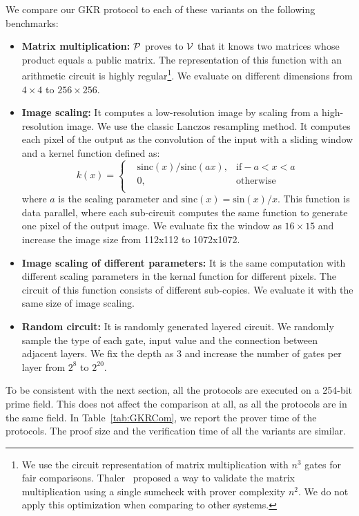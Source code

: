 We compare our GKR protocol to each of these variants on the following benchmarks:
\begin{itemize}
	\item
	\textbf{Matrix multiplication:} $\P$ proves to $\V$ that it knows two matrices whose product equals a public matrix. The representation of this function with an arithmetic circuit is highly regular\footnote{We use the circuit representation of matrix multiplication with $n^3$ gates for fair comparisons. Thaler~\cite{t13} proposed a way to validate the matrix multiplication using a single sumcheck with prover complexity $n^2$. We do not apply this optimization when comparing to other systems.}. We evaluate on different dimensions from $4\times4$ to $256\times256$. 
	\item
	\textbf{Image scaling:} It computes a low-resolution image by scaling from a high-resolution image. We use the classic Lanczos resampling\cite{Lanczos} method. It computes each pixel of the output as the convolution of the input with a sliding window and a kernel function defined as:
	\begin{equation}
	k(x)=\left\{
	\begin{aligned}
	&\text{sinc}(x)/\text{sinc}(ax), &\text{if} -a < x < a\\
	&0, &\text{otherwise}\\
	\end{aligned}
	\right.
	\end{equation}
	where $a$ is the scaling parameter and $\text{sinc}(x) = \text{sin}(x)/x$. This function is data parallel, where each sub-circuit computes the same function to generate one pixel of the output image. We evaluate fix the window as $16\times15$ and increase the image size from 112x112 to 1072x1072.
	\item
	\textbf{Image scaling of different parameters:} It is the same computation with different scaling parameters in the kernal function for different pixels.
	The circuit of this function consists of different sub-copies. We evaluate it with the same size of image scaling.
	\item
	\textbf{Random circuit:} It is randomly generated layered circuit. We randomly sample the type of each gate, input value and the connection between adjacent layers. We fix the depth as 3 and increase the number of gates per layer from $2^8$ to $2^{20}$.
\end{itemize}
To be consistent with the next section, all the protocols are executed on a 254-bit prime field. This does not affect the comparison at all, as all the protocols are in the same field. In Table~\ref{tab:GKRCom}, we report the prover time of the protocols. The proof size and the verification time of all the variants are similar.

